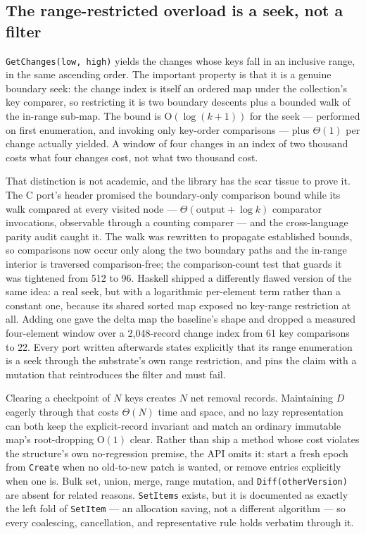 \documentclass[11pt,twoside,openright]{book}
\newcommand{\code}[1]{\texorpdfstring{\textcolor{d7ink}{\texttt{#1}}}{#1}}
\newcommand{\bigoh}[1]{$\mathrm{O}(#1)$}
\begin{document}
\subsection{The range-restricted overload is a seek, not a filter}

\code{GetChanges(low, high)} yields the changes whose keys fall in an inclusive
range, in the same ascending order. The important property is that it is a
genuine boundary seek: the change index is itself an ordered map under the
collection's key comparer, so restricting it is two boundary descents plus a
bounded walk of the in-range sub-map. The bound is \bigoh{\log(k + 1)} for the
seek --- performed on first enumeration, and invoking only key-order comparisons
--- plus $\Theta(1)$ per change actually yielded. A window of four changes in an
index of two thousand costs what four changes cost, not what two thousand cost.

That distinction is not academic, and the library has the scar tissue to prove
it. The C port's header promised the boundary-only comparison bound while its
walk compared at every visited node --- $\Theta(\text{output} + \log k)$
comparator invocations, observable through a counting comparer --- and the
cross-language parity audit caught it. The walk was rewritten to propagate
established bounds, so comparisons now occur only along the two boundary paths
and the in-range interior is traversed comparison-free; the comparison-count
test that guards it was tightened from 512 to 96. Haskell shipped a differently
flawed version of the same idea: a real seek, but with a logarithmic per-element
term rather than a constant one, because its shared sorted map exposed no
key-range restriction at all. Adding one gave the delta map the baseline's shape
and dropped a measured four-element window over a 2{,}048-record change index
from 61 key comparisons to 22. Every port written afterwards states explicitly
that its range enumeration is a seek through the substrate's own range
restriction, and pins the claim with a mutation that reintroduces the filter and
must fail.

\begin{caveatbox}[There is no \code{Clear}, and that is deliberate]
Clearing a checkpoint of $N$ keys creates $N$ net removal records. Maintaining
$D$ eagerly through that costs $\Theta(N)$ time and space, and no lazy
representation can both keep the explicit-record invariant and match an ordinary
immutable map's root-dropping \bigoh{1} clear. Rather than ship a method whose
cost violates the structure's own no-regression premise, the API omits it: start
a fresh epoch from \code{Create} when no old-to-new patch is wanted, or remove
entries explicitly when one is. Bulk set, union, merge, range mutation, and
\code{Diff(otherVersion)} are absent for related reasons. \code{SetItems} exists,
but it is documented as exactly the left fold of \code{SetItem} --- an allocation
saving, not a different algorithm --- so every coalescing, cancellation, and
representative rule holds verbatim through it.
\end{caveatbox}
\end{document}

